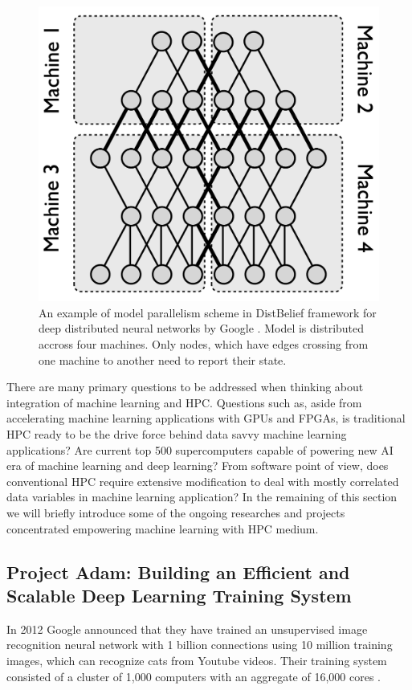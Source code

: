 \documentclass[runningheads,a4paper]{llncs}
\begin{document}
\begin{figure}[h]
	\includegraphics[scale=0.3]{./images/model_parallelism.png}
	\centering
	\caption{An example of model parallelism scheme in DistBelief framework for deep distributed neural networks by Google \cite{dean2012large}. Model is distributed accross four machines. Only nodes, which have edges crossing from one machine to another need to report their state.}
	\label{fig:model_parallelism}
\end{figure}

There are many primary questions to be addressed when thinking about integration of machine learning and HPC. Questions such as, aside from accelerating machine learning applications with GPUs and FPGAs, is traditional HPC ready to be the drive force behind data savvy machine learning applications? Are current top 500 supercomputers capable of powering new AI era of machine learning and deep learning? From software point of view, does conventional HPC require extensive modification to deal with mostly correlated data variables in machine learning application?
In the remaining of this section we will briefly introduce some of the ongoing researches and projects concentrated empowering machine learning with HPC medium.

\subsection*{Project Adam: Building an Efficient and Scalable Deep Learning Training System \cite{chilimbi2014project}}
In 2012 Google announced that they have trained an unsupervised image recognition neural network with 1 billion connections using 10 million training images, which can recognize cats from Youtube videos. Their training system consisted of a cluster of 1,000 computers with an aggregate of 16,000 cores \cite{le2013building}.\\
\end{document}
